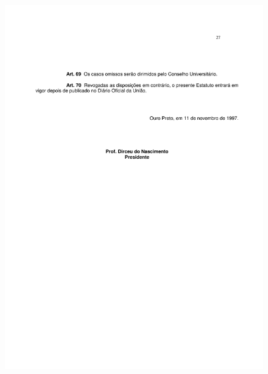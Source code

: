 \begin{figure}[p]
	\centering 
	\includegraphics[scale=0.7]{capitulos/resolucoes/cuni414/cuni414-27.pdf}
\end{figure}

